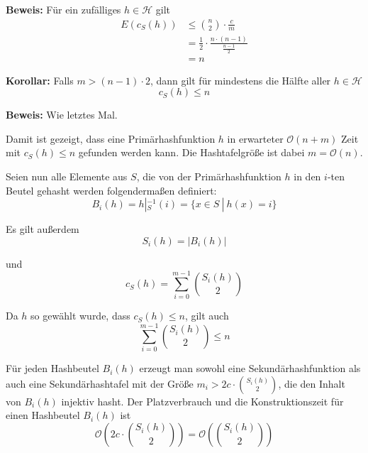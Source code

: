 \documentclass{scrartcl}%
\begin{document}
    \vspace*{0.3cm}
    \textbf{\textsf{Beweis:}} Für ein zufälliges $h \in \mathcal{H}$ gilt
    \begin{equation*}
        \begin{align*}
            E(c_S(h)) &\leq \binom{n}{2} \cdot \frac{c}{m} \\\nonumber
            & = \frac{1}{2} \cdot \frac{n \cdot (n-1)}{\frac{n-1}{2}} \\\nonumber
            & = n
        \end{align*}
    \end{equation*}\proofend

    \newpage
    \textbf{\textsf{Korollar:}} Falls $m > (n-1) \cdot 2$, dann gilt für mindestens die Hälfte aller $h \in \mathcal{H}$
    \begin{equation*}
        c_S(h) \leq n
    \end{equation*}

    \vspace*{0.3cm}
    \textbf{\textsf{Beweis:}} Wie letztes Mal.\proofend

    \vspace*{0.6cm}
    Damit ist gezeigt, dass eine Primärhashfunktion $h$ in erwarteter $\mathcal{O}(n+m)$ Zeit mit $c_S(h)\leq n$ gefunden werden kann. Die Hashtafelgröße ist dabei $m = \mathcal{O}(n)$.

    \vspace*{0.3cm}
    Seien nun alle Elemente aus $S$, die von der Primärhashfunktion $h$ in den $i$-ten Beutel gehasht werden folgendermaßen definiert:
    \begin{equation*}
        B_i(h) = h |^{-1}_S(i) = \{ x \in S\ |\ h(x)=i \}
    \end{equation*}

    Es gilt außerdem
    \begin{equation*}
        S_i(h) = \left| B_i(h) \right|
    \end{equation*}

    und
    \begin{equation*}
        c_S(h) = \sum_{i=0}^{m-1}\binom{S_i(h)}{2}
    \end{equation*}

    Da $h$ so gewählt wurde, dass $c_S(h) \leq n$, gilt auch
    \begin{equation*}
        \sum_{i=0}^{m-1}\binom{S_i(h)}{2} \leq n
    \end{equation*}

    Für jeden Hashbeutel $B_i(h)$ erzeugt man sowohl eine Sekundärhashfunktion
    als auch eine Sekundärhashtafel mit der Größe $m_i > 2c \cdot \binom{S_i(h)}{2}$, die den Inhalt von $B_i(h)$ injektiv hasht.
    Der Platzverbrauch und die Konstruktionszeit für einen Hashbeutel $B_i(h)$ ist
    \begin{equation*}
        \mathcal{O}\left( 2c \cdot \binom{S_i(h)}{2} \right) = \mathcal{O}\left( \binom{S_i(h)}{2} \right)
    \end{equation*}
\end{document}
